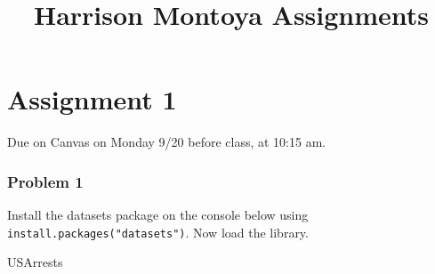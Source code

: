 \documentclass[
]{article}
\title{Harrison Montoya Assignments}
\author{}
\date{\vspace{-2.5em}}
\newenvironment{Shaded}{\begin{snugshade}}{\end{snugshade}}
\newcommand{\NormalTok}[1]{#1}
\begin{document}
\maketitle

\hypertarget{assignment-1}{%
\section{Assignment 1}\label{assignment-1}}

Due on Canvas on Monday 9/20 before class, at 10:15 am.

\hypertarget{problem-1}{%
\subsubsection{Problem 1}\label{problem-1}}

Install the datasets package on the console below using
\texttt{install.packages("datasets")}. Now load the library.

\begin{Shaded}
\begin{Highlighting}[]
\NormalTok{USArrests}
\end{Highlighting}
\end{Shaded}
\end{document}

